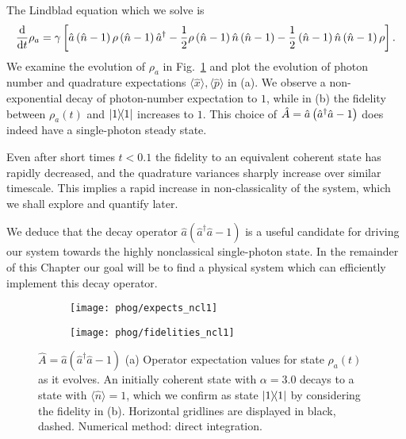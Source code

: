 The Lindblad equation which we solve is
\begin{equation}\label{eqn:phog_ncl_lindblad}
\frac{\mathrm{d}}{\mathrm{d}t} \rho_a = \gamma \left[ \hat{a}\left(\hat{n}-1\right) \rho \left(\hat{n}-1\right)\hat{a}^\dagger - \frac{1}{2} \rho \left(\hat{n}-1\right) \hat{n} \left(\hat{n}-1\right) - \frac{1}{2} \left(\hat{n}-1\right)\hat{n}\left(\hat{n}-1\right) \rho \right].
\end{equation}
We examine the evolution of $\rho_a$ in Fig.~\ref{fig:phog_A_ncl} and plot the evolution of photon number and quadrature expectations $\langle \hat{x}\rangle, \langle \hat{p}\rangle$ in (a). We observe a non-exponential decay of photon-number expectation to $1$,
while in (b) the fidelity between $\rho_a\left(t\right)$ and $\dyad{1}$ increases to $1$. This choice of $\hat{A} = \hat{a}\left(\hat{a}^\dagger \hat{a} - 1\right)$ does indeed have a single-photon steady state. 

Even after short times $t < 0.1$ the fidelity to an equivalent coherent state has rapidly decreased, and the quadrature variances sharply increase over similar timescale. This implies a rapid increase in non-classicality of the system, which we shall explore and quantify later.

We deduce that the decay operator $\hat{a}\left(\hat{a}^\dagger \hat{a} - 1\right)$ is a useful candidate for driving our system towards the highly nonclassical single-photon state. In the remainder of this Chapter our goal will be to find a physical system which can efficiently implement this decay operator.



\begin{figure}[htp]
\captionsetup{width=0.8\linewidth}
\centering
	\begin{subfigure}{0.7\linewidth}
	\centering
	\caption{}
	\texttt{[image: phog/expects\_ncl1]}
	\end{subfigure}
	\begin{subfigure}{0.7\linewidth}
	\centering
	\caption{}
	\texttt{[image: phog/fidelities\_ncl1]}
	\end{subfigure}
\caption{\label{fig:phog_A_ncl}$\hat{A} = \hat{a}\left(\hat{a}^\dagger \hat{a} - 1\right)$ (a) Operator expectation values for state $\rho_a\left(t\right)$ as it evolves. An initially coherent state with $\alpha=3.0$ decays to a state with $\langle \hat{n}\rangle=1$, which we confirm as state $\dyad{1}$ by considering the fidelity in (b). Horizontal gridlines are displayed in black, dashed. Numerical method: direct integration.}
\end{figure}

